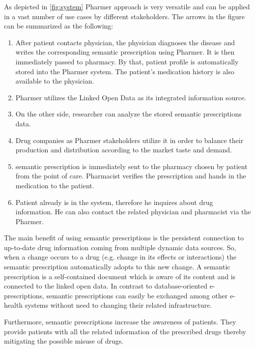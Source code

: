 \documentclass[10pt, conference, compsocconf]{IEEEtran}
\begin{document}
As depicted in \autoref{fig:system} Pharmer approach is very versatile and can be applied in a vast number of use cases by different stakeholders. The arrows in the figure can be summarized as the following:
\begin{enumerate}
\item After patient contacts physician, the physician diagnoses the disease and writes the corresponding semantic prescription using Pharmer. It is then immediately passed to pharmacy. By that, patient profile is automatically stored into the Pharmer system. The patient's medication history is also available to the physician.
\item Pharmer utilizes the Linked Open Data as its integrated information source.
\item On the other side, researcher can analyze the stored semantic prescriptions data.
\item Drug companies as Pharmer stakeholders utilize it in order to balance their production and distribution according to the market taste and demand.
\item semantic prescription is immediately sent to the pharmacy chosen by patient from the point of care. Pharmacist verifies the prescription and hands in the medication to the patient.
\item Patient already is in the system, therefore he inquires about drug information. He can also contact the related physician and pharmacist via the Pharmer.
\end{enumerate}

The main benefit of using semantic prescriptions is the persistent connection to up-to-date drug information coming from multiple dynamic data sources.
So, when a change occurs to a drug (e.g. change in its effects or interactions) the semantic prescription automatically adopts to this new change.
A semantic prescription is a self-contained document which is aware of its content and is connected to the linked open data.
In contrast to database-oriented e-prescriptions, semantic prescriptions can easily be exchanged among other e-health systems without need to changing their related infrastructure.

Furthermore, semantic prescriptions increase the awareness of patients.
They provide patients with all the related information of the prescribed drugs thereby mitigating the possible misuse of drugs.
\end{document}
